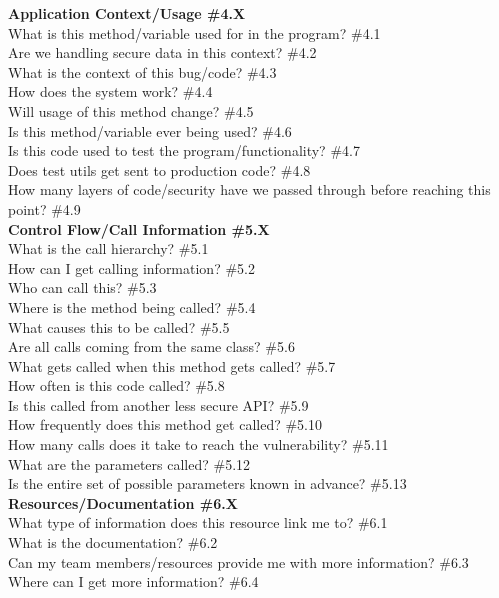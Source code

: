 \documentclass[10pt,journal,compsoc]{IEEEtran}
\begin{document}
\textbf{Application Context/Usage \#4.X} \\
	What is this method/variable used for in the program? \#4.1 \\
	Are we handling secure data in this context? \#4.2 \\
	What is the context of this bug/code? \#4.3 \\
	How does the system work? \#4.4 \\
	Will usage of this method change? \#4.5 \\
	Is this method/variable ever being used? \#4.6 \\
	Is this code used to test the program/functionality? \#4.7 \\
	Does test utils get sent to production code? \#4.8 \\
	How many layers of code/security have we passed through before reaching this point? \#4.9 \\
\textbf{Control Flow/Call Information \#5.X} \\
	What is the call hierarchy?  \#5.1 \\
	How can I get calling information? \#5.2 \\
	Who can call this? \#5.3 \\
	Where is the method being called? \#5.4 \\
	What causes this to be called? \#5.5 \\
	Are all calls coming from the same class? \#5.6 \\
	What gets called when this method gets called? \#5.7 \\
	How often is this code called?  \#5.8 \\
	Is this called from another less secure API?  \#5.9 \\
	How frequently does this method get called?  \#5.10 \\
	How many calls does it take to reach the vulnerability?  \#5.11 \\
	What are the parameters called?  \#5.12 \\
	Is the entire set of possible parameters known in advance?  \#5.13 \\
\textbf{Resources/Documentation \#6.X} \\
	What type of information does this resource link me to? \#6.1 \\
	What is the documentation?  \#6.2 \\
	Can my team members/resources provide me with more information? \#6.3 \\
	Where can I get more information? \#6.4 \\
\end{document}

